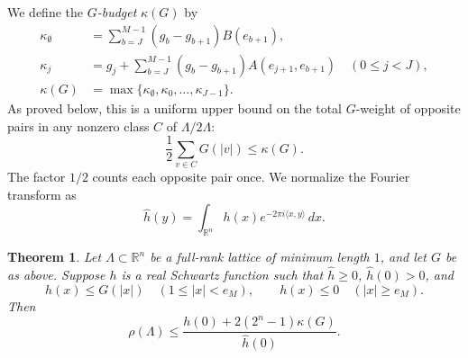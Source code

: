 \documentclass[11pt]{article}
\newtheorem{theorem}{Theorem}
\newcommand{\R}{\mathbb R}
\newcommand{\kap}{\kappa}
\newcommand{\abs}[1]{\left\lvert#1\right\rvert}
\begin{document}
We define the \emph{$G$-budget} $\kap(G)$ by
\begin{align}
 \kap_\emptyset&=\sum_{b=J}^{M-1}(g_b-g_{b+1})B(e_{b+1}),\nonumber\\
 \kap_j&=g_j+\sum_{b=J}^{M-1}(g_b-g_{b+1})A(e_{j+1},e_{b+1})
 \quad(0\le j<J),\label{eq:kappa}\\
 \kap(G)&=\max\{\kap_\emptyset,\kap_0,\ldots,\kap_{J-1}\}.\nonumber
\end{align}
As proved below, this is a uniform upper bound on the total $G$-weight
of opposite pairs in any nonzero class $C$ of $\Lambda/2\Lambda$:
\[
 \frac12\sum_{v\in C}G(|v|)\le\kap(G).
\]
The factor $1/2$ counts each opposite pair once.
We normalize the Fourier transform as
\[
 \widehat h(y)=\int_{\R^n}h(x)e^{-2\pi i\langle x,y\rangle}\,dx.
\]

\begin{theorem}\label{thm:main}
Let $\Lambda\subset\R^n$ be a full-rank lattice of minimum length $1$, and let $G$ be as above. Suppose $h$ is a real
Schwartz function such that $\widehat h\ge0$, $\widehat h(0)>0$, and
\[
 h(x)\le G(\abs{x})\quad(1\le|x|<e_M),\qquad
 h(x)\le0\quad(|x|\ge e_M).
\]
Then
\begin{equation}\label{eq:main}
 \rho(\Lambda)\le\frac{h(0)+2(2^n-1)\kap(G)}{\widehat h(0)}.
\end{equation}
\end{theorem}
\end{document}
